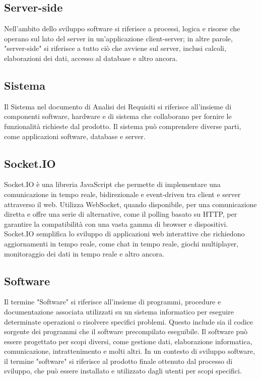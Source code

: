 \subsection*{Server-side} 
Nell'ambito dello sviluppo software si riferisce a processi, logica e risorse che operano sul lato del server in un'applicazione client-server; in altre parole, "server-side" si riferisce a tutto ciò che avviene sul server, inclusi calcoli, elaborazioni dei dati, accesso al database e altro ancora.
\subsection*{Sistema} 
Il Sistema nel documento di Analisi dei Requisiti si riferisce all'insieme di componenti software, hardware e di sistema che collaborano per fornire le funzionalità richieste dal prodotto. Il sistema può comprendere diverse parti, come applicazioni software, database e server.
\subsection*{Socket.IO} 
Socket.IO è una libreria JavaScript che permette di implementare una comunicazione in tempo reale, bidirezionale e event-driven tra client e server attraverso il web. Utilizza WebSocket, quando disponibile, per una comunicazione diretta e offre una serie di alternative, come il polling basato su HTTP, per garantire la compatibilità con una vasta gamma di browser e dispositivi. Socket.IO semplifica lo sviluppo di applicazioni web interattive che richiedono aggiornamenti in tempo reale, come chat in tempo reale, giochi multiplayer, monitoraggio dei dati in tempo reale e altro ancora.
\subsection*{Software} 
Il termine "Software" si riferisce all'insieme di programmi, procedure e documentazione associata utilizzati su un sistema informatico per eseguire determinate operazioni o risolvere specifici problemi. Questo include sia il codice sorgente dei programmi che il software precompilato eseguibile. Il software può essere progettato per scopi diversi, come gestione dati, elaborazione informatica, comunicazione, intrattenimento e molti altri. In un contesto di sviluppo software, il termine "software" si riferisce al prodotto finale ottenuto dal processo di sviluppo, che può essere installato e utilizzato dagli utenti per scopi specifici. 
